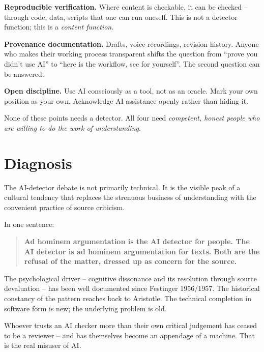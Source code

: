 \textbf{Reproducible verification.} Where content is checkable, it
can be checked -- through code, data, scripts that one can run
oneself. This is not a detector function; this is a
\emph{content function}.

\textbf{Provenance documentation.} Drafts, voice recordings,
revision history. Anyone who makes their working process
transparent shifts the question from \enquote{prove you didn't use
AI} to \enquote{here is the workflow, see for yourself}. The second
question can be answered.

\textbf{Open discipline.} Use AI consciously as a tool, not as an
oracle. Mark your own position as your own. Acknowledge AI
assistance openly rather than hiding it.

None of these points needs a detector. All four need \emph{competent,
honest people who are willing to do the work of understanding}.

\section{Diagnosis}

The AI-detector debate is not primarily technical. It is the
visible peak of a cultural tendency that replaces the strenuous
business of understanding with the convenient practice of source
criticism.

In one sentence:

\begin{quote}
\textbf{Ad hominem argumentation is the AI detector for people. The
AI detector is ad hominem argumentation for texts. Both are the
refusal of the matter, dressed up as concern for the source.}
\end{quote}

The psychological driver -- cognitive dissonance and its resolution
through source devaluation -- has been well documented since
Festinger 1956/1957. The historical constancy of the pattern
reaches back to Aristotle. The technical completion in software
form is new; the underlying problem is old.

Whoever trusts an AI checker more than their own critical judgement
has ceased to be a reviewer -- and has themselves become an
appendage of a machine. That is the real misuser of AI.

